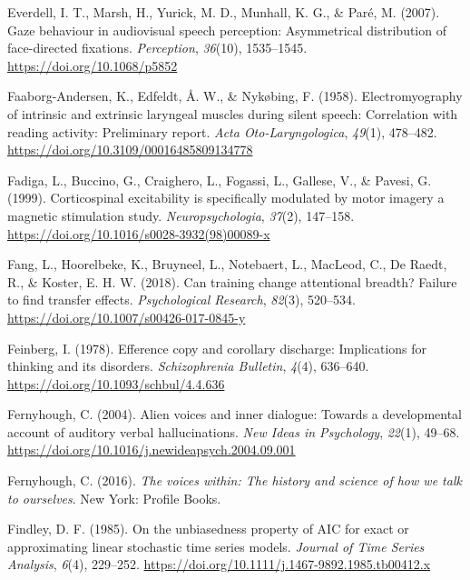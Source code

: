 \documentclass[a4paper,12pt,twoside,onecolumn,openright,final,oldfontcommands]{memoir}
\begin{document}
\leavevmode\hypertarget{ref-everdell_gaze_2007}{}%
Everdell, I. T., Marsh, H., Yurick, M. D., Munhall, K. G., \& Paré, M. (2007). Gaze behaviour in audiovisual speech perception: Asymmetrical distribution of face-directed fixations. \emph{Perception}, \emph{36}(10), 1535--1545. \url{https://doi.org/10.1068/p5852}

\leavevmode\hypertarget{ref-faaborg-andersen_electromyography_1958}{}%
Faaborg-Andersen, K., Edfeldt, Å. W., \& Nykøbing, F. (1958). Electromyography of intrinsic and extrinsic laryngeal muscles during silent speech: Correlation with reading activity: Preliminary report. \emph{Acta Oto-Laryngologica}, \emph{49}(1), 478--482. \url{https://doi.org/10.3109/00016485809134778}

\leavevmode\hypertarget{ref-fadiga_corticospinal_1999}{}%
Fadiga, L., Buccino, G., Craighero, L., Fogassi, L., Gallese, V., \& Pavesi, G. (1999). Corticospinal excitability is specifically modulated by motor imagery a magnetic stimulation study. \emph{Neuropsychologia}, \emph{37}(2), 147--158. \url{https://doi.org/10.1016/s0028-3932(98)00089-x}

\leavevmode\hypertarget{ref-fang_can_2018}{}%
Fang, L., Hoorelbeke, K., Bruyneel, L., Notebaert, L., MacLeod, C., De Raedt, R., \& Koster, E. H. W. (2018). Can training change attentional breadth? Failure to find transfer effects. \emph{Psychological Research}, \emph{82}(3), 520--534. \url{https://doi.org/10.1007/s00426-017-0845-y}

\leavevmode\hypertarget{ref-feinberg_efference_1978}{}%
Feinberg, I. (1978). Efference copy and corollary discharge: Implications for thinking and its disorders. \emph{Schizophrenia Bulletin}, \emph{4}(4), 636--640. \url{https://doi.org/10.1093/schbul/4.4.636}

\leavevmode\hypertarget{ref-fernyhough_alien_2004}{}%
Fernyhough, C. (2004). Alien voices and inner dialogue: Towards a developmental account of auditory verbal hallucinations. \emph{New Ideas in Psychology}, \emph{22}(1), 49--68. \url{https://doi.org/10.1016/j.newideapsych.2004.09.001}

\leavevmode\hypertarget{ref-fernyhough_voices_2016}{}%
Fernyhough, C. (2016). \emph{The voices within: The history and science of how we talk to ourselves}. New York: Profile Books.

\leavevmode\hypertarget{ref-findley_unbiasedness_1985}{}%
Findley, D. F. (1985). On the unbiasedness property of AIC for exact or approximating linear stochastic time series models. \emph{Journal of Time Series Analysis}, \emph{6}(4), 229--252. \url{https://doi.org/10.1111/j.1467-9892.1985.tb00412.x}
\end{document}
